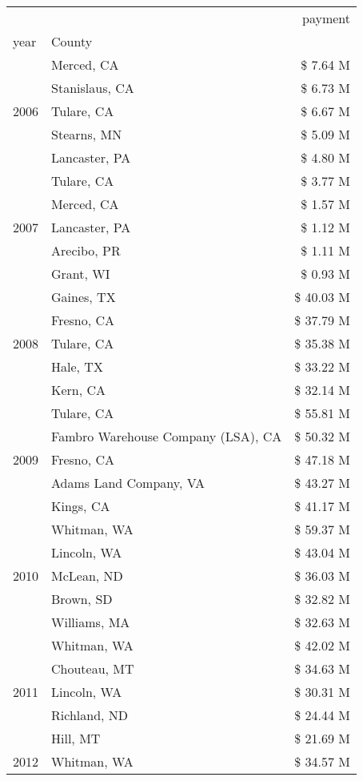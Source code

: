 \begin{longtable}{llr}
\toprule
 &  & payment \\
year & County &  \\
\midrule
\multirow[t]{5}{*}{2006} & Merced, CA & \$ 7.64 M \\
 & Stanislaus, CA & \$ 6.73 M \\
 & Tulare, CA & \$ 6.67 M \\
 & Stearns, MN & \$ 5.09 M \\
 & Lancaster, PA & \$ 4.80 M \\
\cline{1-3}
\multirow[t]{5}{*}{2007} & Tulare, CA & \$ 3.77 M \\
 & Merced, CA & \$ 1.57 M \\
 & Lancaster, PA & \$ 1.12 M \\
 & Arecibo, PR & \$ 1.11 M \\
 & Grant, WI & \$ 0.93 M \\
\cline{1-3}
\multirow[t]{5}{*}{2008} & Gaines, TX & \$ 40.03 M \\
 & Fresno, CA & \$ 37.79 M \\
 & Tulare, CA & \$ 35.38 M \\
 & Hale, TX & \$ 33.22 M \\
 & Kern, CA & \$ 32.14 M \\
\cline{1-3}
\multirow[t]{5}{*}{2009} & Tulare, CA & \$ 55.81 M \\
 & Fambro Warehouse Company (LSA), CA & \$ 50.32 M \\
 & Fresno, CA & \$ 47.18 M \\
 & Adams Land Company, VA & \$ 43.27 M \\
 & Kings, CA & \$ 41.17 M \\
\cline{1-3}
\multirow[t]{5}{*}{2010} & Whitman, WA & \$ 59.37 M \\
 & Lincoln, WA & \$ 43.04 M \\
 & McLean, ND & \$ 36.03 M \\
 & Brown, SD & \$ 32.82 M \\
 & Williams, MA & \$ 32.63 M \\
\cline{1-3}
\multirow[t]{5}{*}{2011} & Whitman, WA & \$ 42.02 M \\
 & Chouteau, MT & \$ 34.63 M \\
 & Lincoln, WA & \$ 30.31 M \\
 & Richland, ND & \$ 24.44 M \\
 & Hill, MT & \$ 21.69 M \\
\cline{1-3}
\multirow[t]{5}{*}{2012} & Whitman, WA & \$ 34.57 M \\

\end{longtable}
